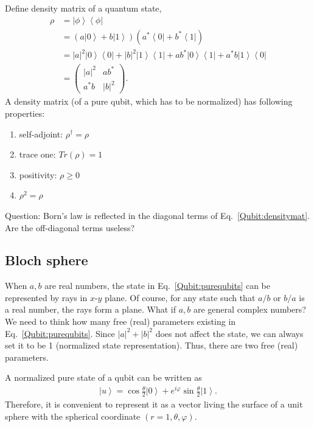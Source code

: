 \documentclass[onecolumn,pra,superscriptaddress,nofootinbib]{revtex4-1}
\newcommand{\bra}[1]{\mbox{$\left\langle #1 \right|$}}
\newcommand{\ket}[1]{\mbox{$\left| #1 \right\rangle$}}
\begin{document}
Define density matrix of a quantum state,
\begin{equation} \label{Qubit:densitymat}
\begin{aligned}
\rho &=\ket{\phi}\bra{\phi} \\
&=(a\ket{0}+b\ket{1})(a^*\bra{0}+b^*\bra{1}) \\
&= |a|^2\ket{0}\bra{0}+|b|^2\ket{1}\bra{1}+ab^*\ket{0}\bra{1}+a^*b\ket{1}\bra{0} \\
&= \begin{pmatrix} |a|^2 & ab^* \\ a^*b & |b|^2\end{pmatrix}.
\end{aligned}
\end{equation}
A density matrix (of a pure qubit, which has to be normalized) has following properties:
\begin{enumerate}
\item
self-adjoint: $\rho^\dag=\rho$

\item
trace one: $Tr(\rho)=1$

\item
positivity: $\rho\ge0$

\item
$\rho^2=\rho$
\end{enumerate}

Question: Born's law is reflected in the diagonal terms of Eq.~\eqref{Qubit:densitymat}. Are the off-diagonal terms useless?


\subsection{Bloch sphere}
When $a, b$ are real numbers, the state in Eq.~\eqref{Qubit:purequbits} can be represented by rays in $x$-$y$ plane. Of course, for any state such that $a/b$ or $b/a$ is a real number, the rays form a plane. What if $a, b$ are general complex numbers? We need to think how many free (real) parameters existing in Eq.~\eqref{Qubit:purequbits}. Since $|a|^2+|b|^2$ does not affect the state, we can always set it to be 1 (normalized state representation). Thus, there are two free (real) parameters.

A normalized pure state of a qubit can be written as
\begin{equation} \label{eq:BlochSphere}
\begin{aligned}
\ket{u} = \cos\frac{\theta}{2}\ket{0}+e^{i\varphi}\sin\frac{\theta}{2}\ket{1}.
\end{aligned}
\end{equation}
Therefore, it is convenient to represent it as a vector living the surface of a unit sphere with the spherical coordinate $(r=1,\theta,\varphi)$.
\end{document}
